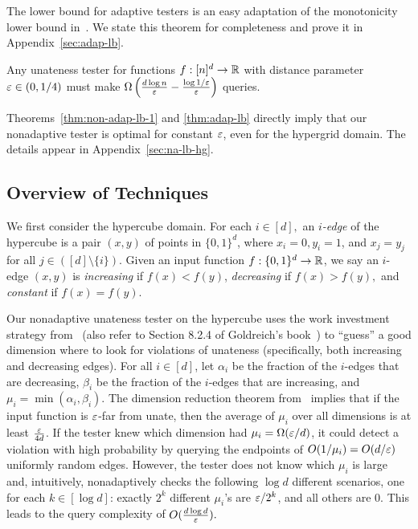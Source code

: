 \noindent The lower bound for adaptive testers is an easy adaptation of the monotonicity lower bound in~\cite{CS14}. 
We state this theorem for completeness and prove it in Appendix~\ref{sec:adap-lb}.
\begin{theorem}\label{thm:adap-lb}
Any unateness tester  for functions $f:[n]^d \to {\mathbb R}$ with distance parameter $\varepsilon \in (0,1/4)$ must make $\Omega\left(\frac{d \log n}{\varepsilon}-\frac{\log 1/\varepsilon}{\varepsilon}\right)$ queries.
\end{theorem}
Theorems~\ref{thm:non-adap-lb-1} and \ref{thm:adap-lb} directly imply that our nonadaptive tester is optimal for constant $\varepsilon$, even for the hypergrid domain. The details appear in Appendix~\ref{sec:na-lb-hg}.

\subsection{Overview of Techniques}\label{sec:intro-tech}
We first consider the hypercube domain. For each $i\in[d],$ an {\em $i$-edge} of the hypercube is a pair $(x,y)$ of points in $\{0,1\}^d$, where $x_i=0,y_i=1$, and $x_j=y_j$ for all $j\in([d] \setminus \{i\})$. Given an input function $f:\{0,1\}^d\to{\mathbb R}$, we say an $i$-edge $(x,y)$ is {\em increasing} if $f(x)<f(y)$, {\em decreasing} if $f(x)>f(y),$ and {\em constant} if $f(x)=f(y)$.

Our nonadaptive unateness tester on the hypercube uses the work investment strategy from~\cite{BerRY14} (also refer to Section 8.2.4 of Goldreich's book~\cite{Go-book}) to ``guess'' a good dimension where to look for violations of unateness (specifically, both increasing and decreasing edges).  For all $i\in[d]$, let $\alpha_i$ be the fraction of the $i$-edges that are decreasing, $\beta_i$ be the fraction of the $i$-edges that are increasing, and $\mu_i = \min(\alpha_i,\beta_i)$. The dimension reduction theorem from~\cite{CDJS17} implies that if the input function is $\varepsilon$-far from unate, then the average of $\mu_i$ over all dimensions is at least $\frac{\varepsilon}{4d}$. If the tester knew which dimension had $\mu_i=\Omega(\varepsilon/d)$, it could detect a violation with high probability by querying the endpoints of $O(1/\mu_i)=O(d/\varepsilon)$ uniformly random edges.
However, the tester does not know which $\mu_i$ is large
and, intuitively, nonadaptively checks the following
$\log d$ different scenarios, one for each $k\in[\log d]$: exactly $2^k$ different
$\mu_i$'s are $\varepsilon/2^k$, and all others are $0$. This leads to the query complexity of $O(\frac {d\log d}{\varepsilon}).$

